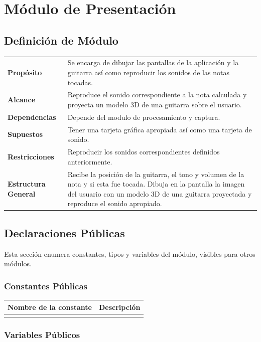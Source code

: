 \documentclass[a4paper,10pt]{article}
\begin{document}
\section{Módulo de Presentación}
\label{sec:presentacion}
\subsection{Definición de Módulo}
\begin{tabularx}{\textwidth}{p{25mm} X}
        \textbf{Propósito} & Se encarga de dibujar las pantallas de la aplicación y la guitarra así como reproducir los sonidos de las notas tocadas.\\
        \textbf{Alcance} & Reproduce el sonido correspondiente a la nota calculada y proyecta un modelo 3D de una guitarra sobre el usuario.\\
        \textbf{Dependencias} & Depende del modulo de procesamiento y captura.\\
        \textbf{Supuestos} & Tener una tarjeta gráfica apropiada así como una tarjeta de sonido.\\
        \textbf{Restricciones} & Reproducir los sonidos correspondientes definidos anteriormente.\\
        \textbf{Estructura General} & Recibe la posición de la guitarra, el
        tono y volumen de la nota y si esta fue tocada. Dibuja en la pantalla
        la imagen del usuario con un modelo 3D de una guitarra proyectada y
        reproduce el sonido apropiado.\\
\end{tabularx}
\subsection{Declaraciones Públicas}
Esta sección enumera constantes, tipos y variables del módulo, visibles para
otros módulos.
\subsubsection{Constantes Públicas}
\begin{tabular}{| p{30mm} | p{10cm} |}
        \hline
        \textbf{Nombre de la \mbox{constante}} & \textbf{Descripción} \\
        \hline
         & \\
        \hline
\end{tabular}
                

\subsubsection{Variables Públicos}
\end{document}
